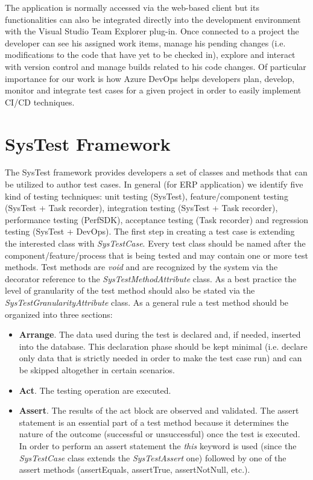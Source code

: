 The application is normally accessed via the web-based client but its functionalities can also be integrated directly into the development environment with the Visual Studio Team Explorer plug-in. Once connected to a project the developer can see his assigned work items, manage his pending changes (i.e. modifications to the code that have yet to be checked in), explore and interact with version control and manage builds related to his code changes. Of particular importance for our work is how Azure DevOps helps developers plan, develop, monitor and integrate test cases for a given project in order to easily implement CI/CD techniques.

\section{SysTest Framework} 

The SysTest framework provides developers a set of classes and methods that can be utilized to author test cases. In general (for ERP application) we identify five kind of testing techniques: unit testing (SysTest), feature/component testing (SysTest + Task recorder), integration testing (SysTest + Task recorder), performance testing (PerfSDK), acceptance testing (Task recorder) and regression testing (SysTest + DevOps).  The first step in creating a test case is extending the interested class with \textit{SysTestCase}. Every test class should be named after the component/feature/process that is being tested and may contain one or more test methods. Test methods are \textit{void} and are recognized by the system via the decorator reference to the \textit{SysTestMethodAttribute} class. As a best practice the level of granularity of the test method should also be stated via the \textit{SysTestGranularityAttribute} class. As a general rule a test method should be organized into three sections:

\begin{itemize}
    \item \textbf{Arrange}. The data used during the test is declared and, if needed, inserted into the database. This declaration phase should be kept minimal (i.e. declare only data that is strictly needed in order to make the test case run) and can be skipped altogether in certain scenarios.
    \item \textbf{Act}. The testing operation are executed.
    \item \textbf{Assert}. The results of the act block are observed and validated. The assert statement is an essential part of a test method because it determines the nature of the outcome (successful or unsuccessful) once the test is executed. In order to perform an assert statement the \textit{this} keyword is used (since the \textit{SysTestCase} class extends the \textit{SysTestAssert} one) followed by one of the assert methods (assertEquals, assertTrue, assertNotNull, etc.).
\end{itemize}

